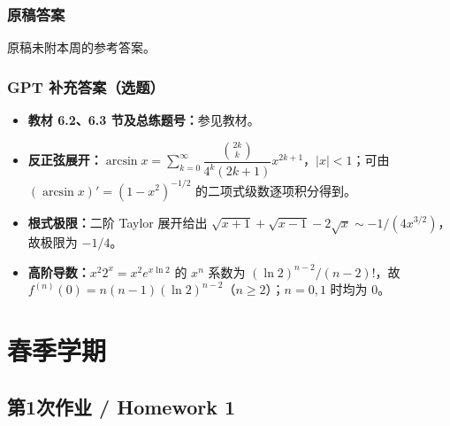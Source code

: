 \documentclass[UTF8,11pt, a4paper, oneside, fontset=none]{ctexbook}
\begin{document}
\subsection*{原稿答案}
\noindent 原稿未附本周的参考答案。
\clearpage
\subsection*{GPT 补充答案（选题）}
\begin{itemize}
\item \textbf{教材 6.2、6.3 节及总练题号：}参见教材。
\item \textbf{反正弦展开：}$\arcsin x=\sum_{k=0}^{\infty}\dfrac{\binom{2k}{k}}{4^k(2k+1)}x^{2k+1}$，$|x|<1$；可由 $(\arcsin x)'=(1-x^2)^{-1/2}$ 的二项式级数逐项积分得到。
\item \textbf{根式极限：}二阶 Taylor 展开给出 $\sqrt{x+1}+\sqrt{x-1}-2\sqrt x\sim-1/(4x^{3/2})$，故极限为 $-1/4$。
\item \textbf{高阶导数：}$x^2 2^x=x^2e^{x\ln2}$ 的 $x^n$ 系数为 $(\ln2)^{n-2}/(n-2)!$，故 $f^{(n)}(0)=n(n-1)(\ln2)^{n-2}$（$n\ge2$）；$n=0,1$ 时均为 $0$。
\end{itemize}
\clearpage
\chapter{春季学期}
\clearpage
\section{第1次作业 / Homework 1}
\end{document}
